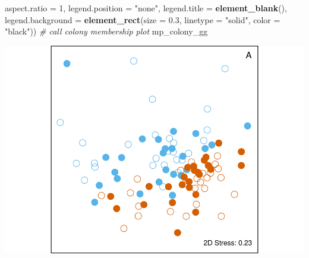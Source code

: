 \documentclass[]{article}
\newenvironment{Shaded}{\begin{snugshade}}{\end{snugshade}}
\newcommand{\KeywordTok}[1]{\textcolor[rgb]{0.13,0.29,0.53}{\textbf{#1}}}
\newcommand{\DataTypeTok}[1]{\textcolor[rgb]{0.13,0.29,0.53}{#1}}
\newcommand{\DecValTok}[1]{\textcolor[rgb]{0.00,0.00,0.81}{#1}}
\newcommand{\FloatTok}[1]{\textcolor[rgb]{0.00,0.00,0.81}{#1}}
\newcommand{\StringTok}[1]{\textcolor[rgb]{0.31,0.60,0.02}{#1}}
\newcommand{\CommentTok}[1]{\textcolor[rgb]{0.56,0.35,0.01}{\textit{#1}}}
\newcommand{\NormalTok}[1]{#1}
\begin{document}
\begin{Shaded}
\begin{Highlighting}[]
        \DataTypeTok{aspect.ratio =} \DecValTok{1}\NormalTok{,}
        \DataTypeTok{legend.position =} \StringTok{"none"}\NormalTok{,}
        \DataTypeTok{legend.title =} \KeywordTok{element_blank}\NormalTok{(),}
        \DataTypeTok{legend.background =} \KeywordTok{element_rect}\NormalTok{(}\DataTypeTok{size =} \FloatTok{0.3}\NormalTok{, }\DataTypeTok{linetype =} \StringTok{"solid"}\NormalTok{, }\DataTypeTok{color =} \StringTok{"black"}\NormalTok{)) }
\CommentTok{# call colony membership plot}
\NormalTok{mp_colony_gg}
\end{Highlighting}
\end{Shaded}

\includegraphics{SealScent_SI_Markdown_2020_1_files/figure-latex/Colony membership in SSB and FWB mom-pup pairs-1.pdf}
\end{document}
